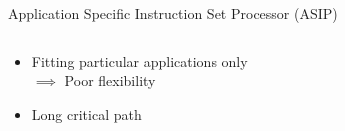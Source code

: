 \documentclass{beamer}
\begin{document}
\begin{CJK}{UTF8}{bkai}
\begin{frame}{Application Specific Instruction Set Processor (ASIP)}
\begin{columns}
\begin{column}{0.6\textwidth}
\begin{itemize}
{\begin{itemize}
                                    \item Fitting particular applications only \\ $\implies$ Poor flexibility
                                    \item Long critical path
                                \end{itemize}
                                }
                        \end{itemize} 
                    \end{column}
                \end{columns} 
            \end{frame}


\end{CJK}
\end{document}
